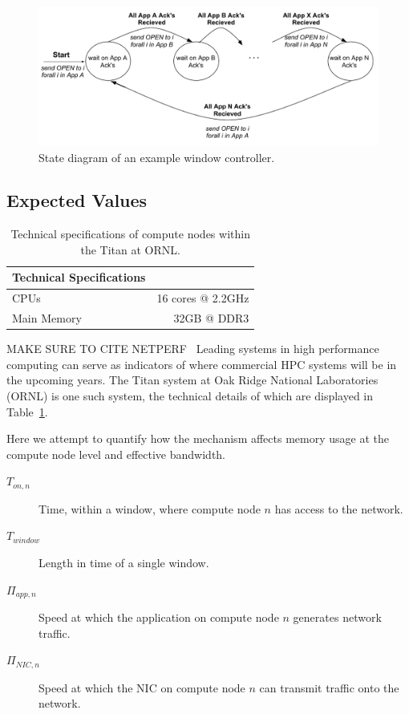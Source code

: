 \documentclass[oneside,12pt]{memoir}
\begin{document}
\begin{figure}
\centering
\includegraphics[scale=0.62]{control_state_diagram.pdf}
\caption{State diagram of an example window controller.}
\label{fig:control_state_diagram}
\end{figure}
\subsection{Expected Values}

\begin{table}
	\begin{center}
	    \begin{tabular}{  l | r  }
	    Technical Specifications & \\ \hline
	    CPUs & 16 cores @ 2.2GHz \\
	    Main Memory & 32GB @ DDR3\\
	    \end{tabular}
	\end{center}
	\caption{Technical specifications of compute nodes within the Titan at ORNL.}
	\label{tab:titan_ORNL}
\end{table}
MAKE SURE TO CITE NETPERF~\cite{netperf}
Leading systems in high performance computing can serve as indicators of where commercial HPC systems will be in the upcoming years. The Titan system at Oak Ridge National Laboratories (ORNL) is one such system, the technical details of which are displayed in Table~\ref{tab:titan_ORNL}.

Here we attempt to quantify how the mechanism affects memory usage at the compute node level and effective bandwidth.
\begin{description}
    \item[$T_{on, n}$] Time, within a window, where compute node $n$ has access to the network.
    \item[$T_{window}$] Length in time of a single window.
    \item[$\Pi_{app, n}$] Speed at which the application on compute node $n$ generates network traffic.
    \item[$\Pi_{NIC, n}$] Speed at which the NIC on compute node $n$ can transmit traffic onto the network.
\end{description} 
\end{document}
